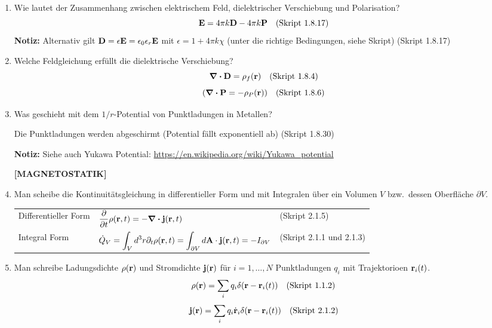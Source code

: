 \documentclass{scrartcl}
\newcommand{\ds}{\displaystyle}
\begin{document}
\begin{enumerate}
    \item Wie lautet der Zusammenhang zwischen elektrischem Feld, 
          dielektrischer Verschiebung und Polarisation?
          $$\vb E= 4\pi k\vb D - 4\pi k\vb P \quad\text{(Skript 1.8.17)}$$
          \textbf{Notiz:} Alternativ gilt $\vb D=\epsilon \vb E
          =\epsilon_0\epsilon_r \vb E$ mit
          $\epsilon=1+4\pi k\chi$ 
          (unter die richtige Bedingungen, siehe Skript) (Skript 1.8.17)\\

    \item Welche Feldgleichung erfüllt die dielektrische Verschiebung?
          $$\div \vb D=\rho_f(\vb r)\quad\text{(Skript 1.8.4)}$$
          $$\qty(\div \vb P=-\rho_P(\vb r))\quad\text{(Skript 1.8.6)}$$

    \item Was geschieht mit dem $1/r$-Potential von Punktladungen in
          Metallen?
          \begin{center}
            Die Punktladungen werden abgeschirmt (Potential fällt 
            exponentiell ab)
            (Skript 1.8.30)
          \end{center}
          \textbf{Notiz:} Siehe auch Yukawa Potential: 
          \url{https://en.wikipedia.org/wiki/Yukawa_potential} 

    \textbf{[MAGNETOSTATIK]}
    \item Man scheibe die Kontinuitätsgleichung in differentieller Form
          und mit Integralen über ein Volumen $V$ bzw.\ dessen Oberfläche 
          $\partial V$.
          \begin{center}
          \begin{tabular}{lll}
            Differentieller Form 
                              & $\ds\pdv{t}\rho(\vb r, t)=
                                 -\div\vb j(\vb r, t)$
                                & (Skript 2.1.5)\\
            Integral Form     & $\ds\dot Q_V
                                =\int_V d^3r\partial_t\rho(\vb r,t)=
                                \int_{\partial V}d\vb A\cdot
                                \vb j(\vb r, t)=-I_{\partial V}$
                                & (Skript 2.1.1 und 2.1.3)\\
          \end{tabular}
          \end{center}

    \item Man schreibe Ladungsdichte $\rho(\vb r)$ und Stromdichte
          $\vb j(\vb r)$ für $i=1,\ldots,N$ Punktladungen $q_i$ mit 
          Trajektorioen $\vb r_i(t)$.
          $$\rho(\vb r)=\sum_i q_i\delta(\vb r-\vb r_i(t))
          \quad \text{(Skript 1.1.2)}$$
          $$\vb j(\vb r)=\sum_i q_i\dot{\vb r}_i\delta(\vb r-\vb r_i(t))
          \quad \text{(Skript 2.1.2)}$$


\end{enumerate}
\end{document}
